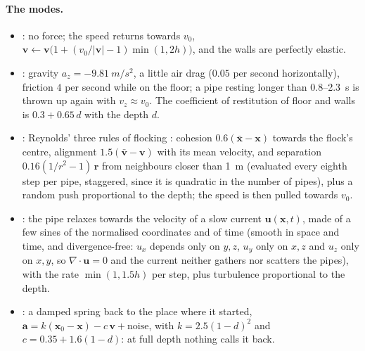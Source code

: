 \paragraph{The modes.}
\begin{itemize}[nosep]
  \item {}: no force; the speed returns towards $v_0$, $\mathbf v \leftarrow \mathbf v\bigl(1 + (v_0/|\mathbf v| - 1)\min(1, 2h)\bigr)$,
    and the walls are perfectly elastic.
  \item {}: gravity $a_z = -\SI{9.81}{m/s^2}$, a little air drag ($0.05$ per second horizontally), friction $4$ per
    second while on the floor; a pipe resting longer than $0.8$--\SI{2.3}{s} is thrown up again with $v_z\approx v_0$.
    The coefficient of restitution of floor and walls is $0.3+0.65\,d$ with the depth $d$.
  \item {}: Reynolds' three rules of flocking \citep{reynolds1987}: cohesion $0.6(\bar{\mathbf x}-\mathbf x)$
    towards the flock's centre, alignment $1.5(\bar{\mathbf v}-\mathbf v)$ with its mean velocity, and separation
    $0.16(1/r^2 - 1)\,\mathbf r$ from neighbours closer than \SI{1}{m} (evaluated every eighth step per pipe, staggered,
    since it is quadratic in the number of pipes), plus a random push proportional to the depth; the speed is then
    pulled towards $v_0$.
  \item {}: the pipe relaxes towards the velocity of a slow current
    $\mathbf u(\mathbf x,t)$, made of a few sines of the normalised coordinates and of time (smooth in space and
    time, and divergence-free: $u_x$ depends only on $y,z$, $u_y$ only on $x,z$ and $u_z$ only on $x,y$, so
$\nabla\cdot\mathbf u = 0$ and the current neither gathers nor scatters the pipes), with the rate
    $\min(1,1.5h)$ per step, plus turbulence proportional to the depth.
  \item {}: a damped spring back to the place where it started,
    $\mathbf a = k(\mathbf x_0 - \mathbf x) - c\,\mathbf v + \text{noise}$, with $k = 2.5(1-d)^2$ and
    $c = 0.35 + 1.6(1-d)$: at full depth nothing calls it back.
\end{itemize}

